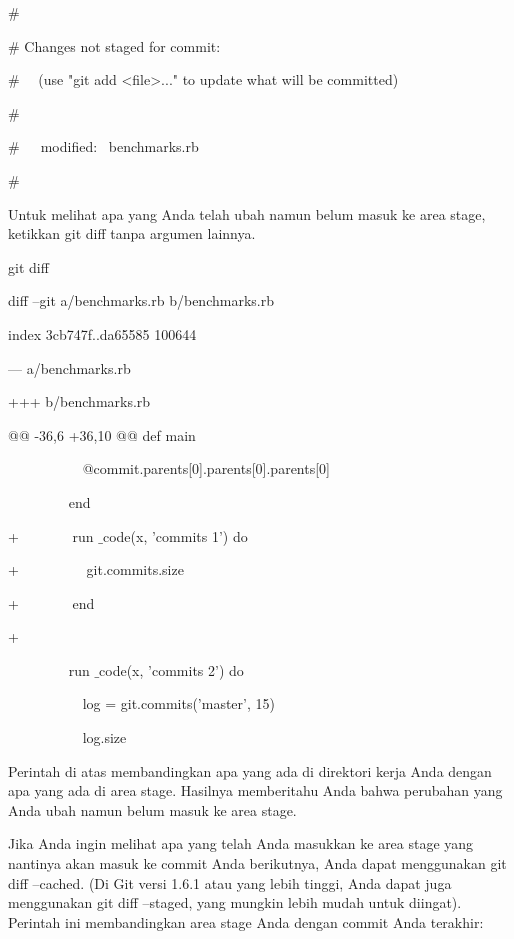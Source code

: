 \noindent 
 $  \#  $ \par
\noindent 
 $  \#  $ Changes not staged for commit: \par
\noindent 
 $  \#  $~~ (use "git add <file>..." to update what will be committed) \par
\noindent 
 $  \#  $ \par
\noindent 
 $  \#  $~~~modified:~  benchmarks.rb \par
\noindent 
 $  \#  $ \par
\noindent 
Untuk melihat apa yang Anda telah ubah namun belum masuk ke area stage, ketikkan git diff tanpa argumen lainnya. \par
\vspace{12pt}
\noindent 
git diff \par
\noindent 
diff --git a/benchmarks.rb b/benchmarks.rb \par
\noindent 
index 3cb747f..da65585 100644 \par
\noindent 
--- a/benchmarks.rb \par
\noindent 
+++ b/benchmarks.rb \par
\noindent 
@@ -36,6 +36,10 @@ def main \par
\noindent 
~~~~~~~~~~ @commit.parents[0].parents[0].parents[0] \par
\noindent 
~~~~~~~~ end \par
\vspace{12pt}
\noindent 
+~~~~~~~ run $  \_  $code(x, 'commits 1') do \par
\noindent 
+~~~~~~~~~ git.commits.size \par
\noindent 
+~~~~~~~ end \par
\noindent 
+ \par
\noindent 
~~~~~~~~ run $  \_  $code(x, 'commits 2') do \par
\noindent 
~~~~~~~~~~ log = git.commits('master', 15) \par
\noindent 
~~~~~~~~~~ log.size \par
\noindent 
Perintah di atas membandingkan apa yang ada di direktori kerja Anda dengan apa yang ada di area stage. Hasilnya memberitahu Anda bahwa perubahan yang Anda ubah namun belum masuk ke area stage. \par
\noindent 
Jika Anda ingin melihat apa yang telah Anda masukkan ke area stage yang nantinya akan masuk ke commit Anda berikutnya, Anda dapat menggunakan git diff --cached. (Di Git versi 1.6.1 atau yang lebih tinggi, Anda dapat juga menggunakan git diff --staged, yang mungkin lebih mudah untuk diingat). Perintah ini membandingkan area stage Anda dengan commit Anda terakhir: \par
